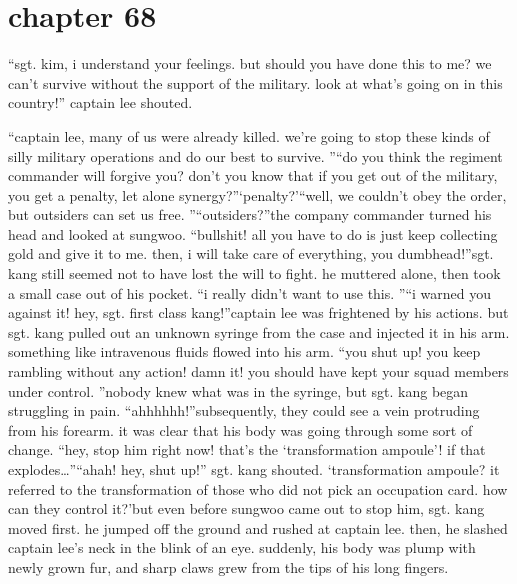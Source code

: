 \section{chapter 68}

                            “sgt.
 kim, i understand your feelings.
 but should you have done this to me? we can’t survive without the support of the military.
 look at what’s going on in this country!” captain lee shouted.





“captain lee, many of us were already killed.
 we’re going to stop these kinds of silly military operations and do our best to survive.
”“do you think the regiment commander will forgive you? don’t you know that if you get out of the military, you get a penalty, let alone synergy?”‘penalty?’“well, we couldn’t obey the order, but outsiders can set us free.
”“outsiders?”the company commander turned his head and looked at sungwoo.
“bullshit! all you have to do is just keep collecting gold and give it to me.
 then, i will take care of everything, you dumbhead!”sgt.
 kang still seemed not to have lost the will to fight.
 he muttered alone, then took a small case out of his pocket.
“i really didn’t want to use this.
”“i warned you against it! hey, sgt.
 first class kang!”captain lee was frightened by his actions.
 but sgt.
 kang pulled out an unknown syringe from the case and injected it in his arm.
 something like intravenous fluids flowed into his arm.
“you shut up! you keep rambling without any action! damn it! you should have kept your squad members under control.
”nobody knew what was in the syringe, but sgt.
 kang began struggling in pain.
“ahhhhhh!”subsequently, they could see a vein protruding from his forearm.
 it was clear that his body was going through some sort of change.
“hey, stop him right now! that’s the ‘transformation ampoule’! if that explodes…”“ahah! hey, shut up!” sgt.
 kang shouted.
‘transformation ampoule? it referred to the transformation of those who did not pick an occupation card.
 how can they control it?’but even before sungwoo came out to stop him, sgt.
 kang moved first.
 he jumped off the ground and rushed at captain lee.
 then, he slashed captain lee’s neck in the blink of an eye.
suddenly, his body was plump with newly grown fur, and sharp claws grew from the tips of his long fingers.

